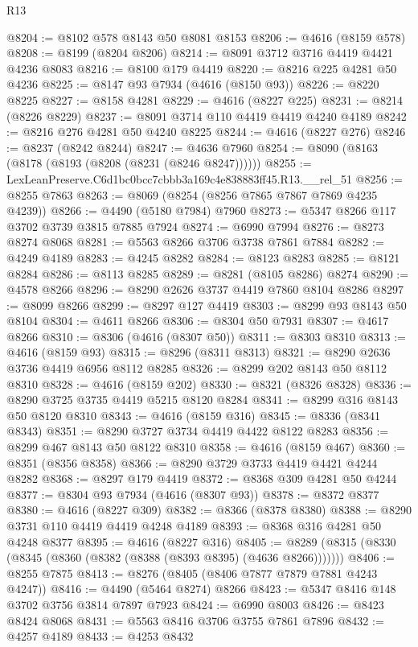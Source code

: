 \begin{lexlean}{R13}
\begin{coremodule}
@8204 := @8102 @578 @8143 @50 @8081 @8153
@8206 := @4616 (@8159 @578)
@8208 := @8199 (@8204 @8206)
@8214 := @8091 @3712 @3716 @4419 @4421 @4236 @8083
@8216 := @8100 @179 @4419
@8220 := @8216 @225 @4281 @50 @4236
@8225 := @8147 @93 @7934 (@4616 (@8150 @93))
@8226 := @8220 @8225
@8227 := @8158 @4281
@8229 := @4616 (@8227 @225)
@8231 := @8214 (@8226 @8229)
@8237 := @8091 @3714 @110 @4419 @4419 @4240 @4189
@8242 := @8216 @276 @4281 @50 @4240 @8225
@8244 := @4616 (@8227 @276)
@8246 := @8237 (@8242 @8244)
@8247 := @4636 @7960
@8254 := @8090 (@8163 (@8178 (@8193 (@8208 (@8231 (@8246 @8247))))))
@8255 := LexLeanPreserve.C6d1bc0bcc7cbbb3a169c4e838883ff45.R13.__rel_51
@8256 := @8255 @7863
@8263 := @8069 (@8254 (@8256 @7865 @7867 @7869 @4235 @4239))
@8266 := @4490 (@5180 @7984) @7960
@8273 := @5347 @8266 @117 @3702 @3739 @3815 @7885 @7924
@8274 := @6990 @7994
@8276 := @8273 @8274 @8068
@8281 := @5563 @8266 @3706 @3738 @7861 @7884
@8282 := @4249 @4189
@8283 := @4245 @8282
@8284 := @8123 @8283
@8285 := @8121 @8284
@8286 := @8113 @8285
@8289 := @8281 (@8105 @8286) @8274
@8290 := @4578 @8266
@8296 := @8290 @2626 @3737 @4419 @7860 @8104 @8286
@8297 := @8099 @8266
@8299 := @8297 @127 @4419
@8303 := @8299 @93 @8143 @50 @8104
@8304 := @4611 @8266
@8306 := @8304 @50 @7931
@8307 := @4617 @8266
@8310 := @8306 (@4616 (@8307 @50))
@8311 := @8303 @8310
@8313 := @4616 (@8159 @93)
@8315 := @8296 (@8311 @8313)
@8321 := @8290 @2636 @3736 @4419 @6956 @8112 @8285
@8326 := @8299 @202 @8143 @50 @8112 @8310
@8328 := @4616 (@8159 @202)
@8330 := @8321 (@8326 @8328)
@8336 := @8290 @3725 @3735 @4419 @5215 @8120 @8284
@8341 := @8299 @316 @8143 @50 @8120 @8310
@8343 := @4616 (@8159 @316)
@8345 := @8336 (@8341 @8343)
@8351 := @8290 @3727 @3734 @4419 @4422 @8122 @8283
@8356 := @8299 @467 @8143 @50 @8122 @8310
@8358 := @4616 (@8159 @467)
@8360 := @8351 (@8356 @8358)
@8366 := @8290 @3729 @3733 @4419 @4421 @4244 @8282
@8368 := @8297 @179 @4419
@8372 := @8368 @309 @4281 @50 @4244
@8377 := @8304 @93 @7934 (@4616 (@8307 @93))
@8378 := @8372 @8377
@8380 := @4616 (@8227 @309)
@8382 := @8366 (@8378 @8380)
@8388 := @8290 @3731 @110 @4419 @4419 @4248 @4189
@8393 := @8368 @316 @4281 @50 @4248 @8377
@8395 := @4616 (@8227 @316)
@8405 := @8289 (@8315 (@8330 (@8345 (@8360 (@8382 (@8388 (@8393 @8395) (@4636 @8266)))))))
@8406 := @8255 @7875
@8413 := @8276 (@8405 (@8406 @7877 @7879 @7881 @4243 @4247))
@8416 := @4490 (@5464 @8274) @8266
@8423 := @5347 @8416 @148 @3702 @3756 @3814 @7897 @7923
@8424 := @6990 @8003
@8426 := @8423 @8424 @8068
@8431 := @5563 @8416 @3706 @3755 @7861 @7896
@8432 := @4257 @4189
@8433 := @4253 @8432

\end{coremodule}
\end{lexlean}
